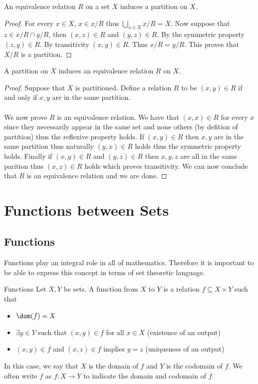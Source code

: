 \documentclass[a4paper]{article}
\begin{document}
\begin{thm}{}{} An equivalence relation $R$ on a set $X$ induces a partition on $X$. \tcbline
\begin{proof}
For every $x\in X$, $x\in x/R$ thus $\bigcup_{x\in X}x/R=X$. Now suppose that $z\in x/R\cap y/R$, then $(x,z)\in R$ and $(y,z)\in R$. By the symmetric property $(z,y)\in R$. By transitivity $(x,y)\in R$. Thus $x/R=y/R$. This proves that $X/R$ is a partition. 
\end{proof}
\end{thm}

\begin{thm}{}{} A partition on $X$ induces an equivalence relation $R$ on $X$. \tcbline
\begin{proof} Suppose that $X$ is partitioned. Define a relation $R$ to be $(x,y)\in R$ if and only if $x,y$ are in the same partition. \\~\\

We now prove $R$ is an equivalence relation. We have that $(x,x)\in R$ for every $x$ since they necessarily appear in the same set and none others (by defition of partition) thus the reflexive property holds. If $(x,y)\in R$ then $x,y$ are in the same partition thus naturally $(y,x)\in R$ holds thus the symmetric property holds. Finally if $(x,y)\in R$ and $(y,z)\in R$ then $x,y,z$ are all in the same parition thus $(x,z)\in R$ holds which proves transitivity. We can now conclude that $R$ is an equivalence relation and we are done. 
\end{proof}
\end{thm}

\pagebreak
\section{Functions between Sets}
\subsection{Functions}
Functions play an integral role in all of mathematics. Therefore it is important to be able to express this concept in terms of set theoretic language. 
\begin{defn}{Functions}{} Let $X,Y$ be sets. A function from $X$ to $Y$ is a relation $f\subseteq X\times Y$ such that
\begin{itemize}
\item $\dom(f)=X$
\item $\exists y\in Y$ such that $(x,y)\in f$ for all $x\in X$ (existence of an output)
\item $(x,y)\in f$ and $(x,z)\in f$ implies $y=z$ (uniqueness of an output)
\end{itemize}
In this case, we say that $X$ is the domain of $f$ and $Y$ is the codomain of $f$. We often write $f$ as $f:X\to Y$ to indicate the domain and codomain of $f$. 
\end{defn}
\end{document}
